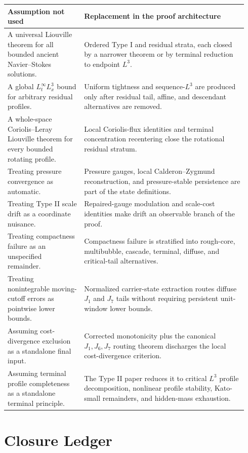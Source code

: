 \documentclass[11pt]{amsart}
\begin{document}
\begin{longtable}{@{}>{\raggedright\arraybackslash}p{0.30\linewidth}>{\raggedright\arraybackslash}p{0.64\linewidth}@{}}
\toprule
\textbf{Assumption not used} & \textbf{Replacement in the proof architecture} \\
\midrule
\endhead
A universal Liouville theorem for all bounded ancient Navier--Stokes solutions. & Ordered Type I and residual strata, each closed by a narrower theorem or by terminal reduction to endpoint \(L^3\). \\
A global \(L^\infty_tL^3_x\) bound for arbitrary residual profiles. & Uniform tightness and sequence-\(L^3\) are produced only after residual tail, affine, and descendant alternatives are removed. \\
A whole-space Coriolis--Leray Liouville theorem for every bounded rotating profile. & Local Coriolis-flux identities and terminal concentration recentering close the rotational residual stratum. \\
Treating pressure convergence as automatic. & Pressure gauges, local Calderon--Zygmund reconstruction, and pressure-stable persistence are part of the state definitions. \\
Treating Type II scale drift as a coordinate nuisance. & Repaired-gauge modulation and scale-cost identities make drift an observable branch of the proof. \\
Treating compactness failure as an unspecified remainder. & Compactness failure is stratified into rough-core, multibubble, cascade, terminal, diffuse, and critical-tail alternatives. \\
Treating nonintegrable moving-cutoff errors as pointwise lower bounds. & Normalized carrier-state extraction routes diffuse \(J_1\) and \(J_7\) tails without requiring persistent unit-window lower bounds. \\
Assuming cost-divergence exclusion as a standalone final input. & Corrected monotonicity plus the canonical \(J_1,J_6,J_7\) routing theorem discharges the local cost-divergence criterion. \\
Assuming terminal profile completeness as a standalone terminal principle. & The Type II paper reduces it to critical \(L^3\) profile decomposition, nonlinear profile stability, Kato-small remainders, and hidden-mass exhaustion. \\
\bottomrule
\end{longtable}

\section{Closure Ledger}
\end{document}
